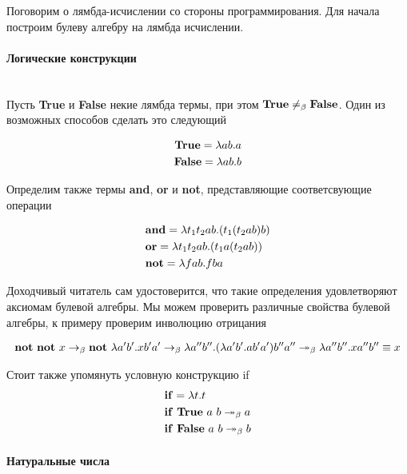 \documentclass[lambda.tex]{subfiles}
\begin{document}
Поговорим о лямбда-исчислении со стороны программирования. Для начала построим булеву алгебру на лямбда исчислении.

\paragraph{Логические конструкции} %
\label{par:bolean}
~\\

Пусть \textbf{True} и \textbf{False} некие лямбда термы, при этом $\text{\textbf{True}} \neq_\beta \text{\textbf{False}}$. Один из возможных способов сделать это следующий

\begin{align*}
\text{\textbf{True}} = \lambda a b.a\\
\text{\textbf{False}} = \lambda a b.b
\end{align*}

Определим также термы \textbf{and}, \textbf{or} и \textbf{not}, представляющие соответсвующие операции

\begin{align*}
&\text{\textbf{and}} = \lambda t_1 t_2 a b . (t_1 (t_2 a b) b)\\
&\text{\textbf{or}} = \lambda t_1 t_2 a b.(t_1 a (t_2 a b))\\
&\text{\textbf{not}} = \lambda f a b . f b a
\end{align*}

Доходчивый читатель сам удостоверится, что такие определения удовлетворяют аксиомам булевой алгебры.
Мы можем проверить различные свойства булевой алгебры, к примеру проверим инволюцию отрицания

\begin{align*}
	\text{\textbf{not}}\ \text{\textbf{not}}\ x \rightarrow_\beta
	\text{\textbf{not}}\ \lambda a' b' . x b' a' \rightarrow_\beta
	\lambda a'' b'' . (\lambda a' b' . a b' a') b'' a'' \twoheadrightarrow_\beta
	\lambda a'' b'' . x a'' b'' \equiv x
\end{align*}

Стоит также упомянуть условную конструкцию if
\begin{align*}
	&\text{\textbf{if}} = \lambda t. t\\
	&\text{\textbf{if}}\ \text{\textbf{True}}\ a\ b \twoheadrightarrow_\beta a\\
	&\text{\textbf{if}}\ \text{\textbf{False}}\ a\ b \twoheadrightarrow_\beta b\\
\end{align*}

\paragraph{Натуральные числа} %
\label{par:natural_numbers}
~\\
\end{document}
